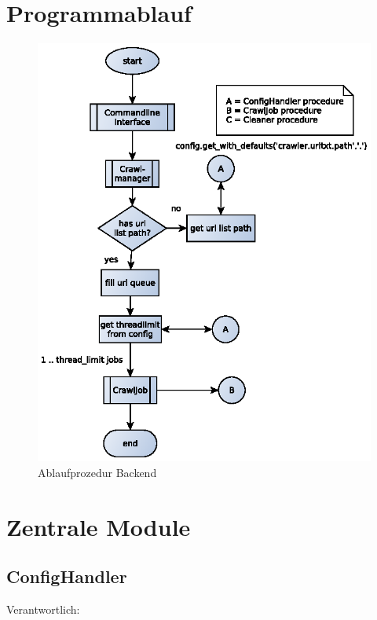 \section{Programmablauf} 
\label{sec:programmablauf}
\begin{figure}[H]
\centering
\label{dia:design:backend:overview}
\includegraphics[width=1.3\textwidth]{design/backend/gfx/backend_procedure.eps}
\caption{Ablaufprozedur Backend}
\end{figure}


\newpage
\section{Zentrale Module} 
\label{sec:zentrale_module}

\subsection{ConfigHandler}
Verantwortlich: \flo

